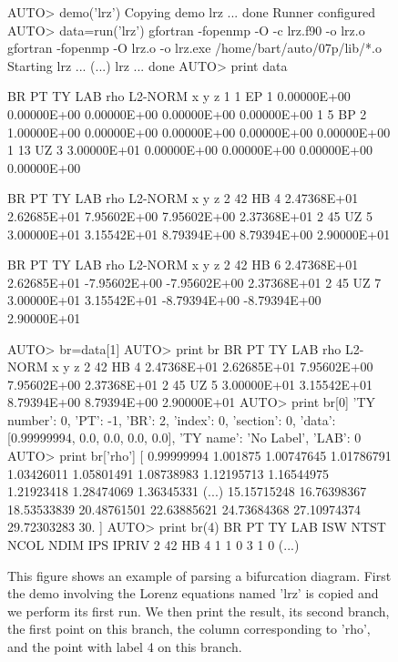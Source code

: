 \documentclass[12pt]{report}
\begin{document}
 \begin{figure}[htbp]
 {\small \begin{center} \begin{boxedverbatim}
 AUTO> demo('lrz')
 Copying demo lrz ... done
 Runner configured
 AUTO> data=run('lrz')
 gfortran -fopenmp -O -c lrz.f90 -o lrz.o
 gfortran -fopenmp -O lrz.o -o lrz.exe /home/bart/auto/07p/lib/*.o
 Starting lrz ...
(...)
lrz ... done
 AUTO> print data

  BR    PT  TY  LAB      rho         L2-NORM          x             y             z       
   1     1  EP    1   0.00000E+00   0.00000E+00   0.00000E+00   0.00000E+00   0.00000E+00
   1     5  BP    2   1.00000E+00   0.00000E+00   0.00000E+00   0.00000E+00   0.00000E+00
   1    13  UZ    3   3.00000E+01   0.00000E+00   0.00000E+00   0.00000E+00   0.00000E+00

  BR    PT  TY  LAB      rho         L2-NORM          x             y             z       
   2    42  HB    4   2.47368E+01   2.62685E+01   7.95602E+00   7.95602E+00   2.37368E+01
   2    45  UZ    5   3.00000E+01   3.15542E+01   8.79394E+00   8.79394E+00   2.90000E+01

  BR    PT  TY  LAB      rho         L2-NORM          x             y             z       
   2    42  HB    6   2.47368E+01   2.62685E+01  -7.95602E+00  -7.95602E+00   2.37368E+01
   2    45  UZ    7   3.00000E+01   3.15542E+01  -8.79394E+00  -8.79394E+00   2.90000E+01

 AUTO> br=data[1]
 AUTO> print br
  BR    PT  TY  LAB      rho         L2-NORM          x             y             z       
   2    42  HB    4   2.47368E+01   2.62685E+01   7.95602E+00   7.95602E+00   2.37368E+01
   2    45  UZ    5   3.00000E+01   3.15542E+01   8.79394E+00   8.79394E+00   2.90000E+01
 AUTO> print br[0]
 {'TY number': 0, 'PT': -1, 'BR': 2, 'index': 0, 'section': 0,
  'data': [0.99999994, 0.0, 0.0, 0.0, 0.0], 'TY name': 'No Label', 'LAB': 0}
 AUTO> print br['rho']
[ 0.99999994  1.001875    1.00747645  1.01786791  1.03426011  1.05801491
  1.08738983  1.12195713  1.16544975  1.21923418  1.28474069  1.36345331
(...)
 15.15715248 16.76398367 18.53533839 20.48761501 22.63885621 24.73684368
 27.10974374 29.72303283 30.        ]
 AUTO> print br(4)
  BR    PT  TY  LAB ISW NTST NCOL NDIM IPS IPRIV
   2    42  HB    4   1    1    0    3   1     0
(...)
 \end{boxedverbatim}
 \end{center} 
 }
 \caption[An example of processing a bifurcation diagram of a run.]
 {This figure shows an example of parsing a bifurcation diagram.
 First the demo involving the Lorenz equations named 'lrz' is copied
 and we perform its first run. We then print
 the result, its second branch, the first point on this branch,
 the column corresponding to 'rho', and the point with
 label 4 on this branch.
 }
 \label{exa:clui parse diagram}
 \end{figure}
\end{document}
